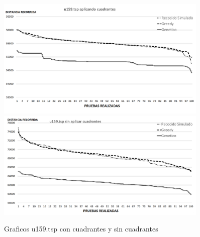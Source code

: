  \begin{figure}[hbtp]
    \centering
        \includegraphics[width=0.9\textwidth]{PruebasResultados/Experimentos_Graficos_Con/u159.png}
        \includegraphics[width=0.9\textwidth]{PruebasResultados/Experimentos_Graficos_Sin/u159.png}
        \caption{Graficos u159.tsp con cuadrantes y sin cuadrantes}
        \label{fig:u159_grafica.png}
\end{figure}
\newpage


